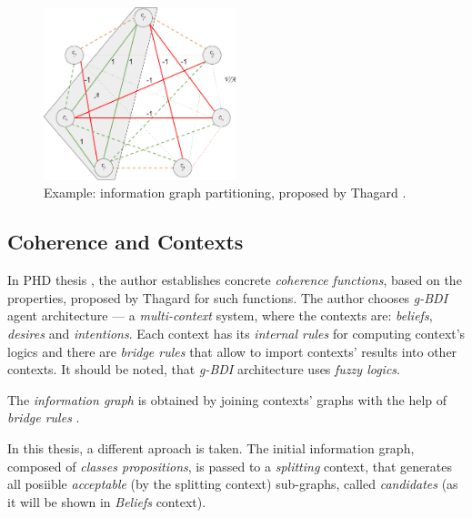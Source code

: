 \begin{figure}[h]
  \centering
  \includegraphics[width=0.5\textwidth]{img/UAB-splitting.png} %
  \caption{Example: information graph partitioning, proposed by Thagard
           \cite{ThagVerb98, UAB-Thesis}. }
  \label{fig:UAB-partition}
\end{figure}



\subsection{Coherence and Contexts}
\label{sec:coherence}

In PHD thesis \cite{UAB-Thesis}, the author establishes concrete
\emph{coherence functions}, based on the properties, proposed by Thagard for
such functions. The author chooses \emph{g-BDI} agent architecture ---
a \emph{multi-context} system, where the contexts are: \emph{beliefs},
\emph{desires} and \emph{intentions}. Each context has its \emph{internal rules}
for computing context's logics and there are \emph{bridge rules} that allow to
import contexts' results into other contexts. It should be noted, that \emph{g-BDI}
architecture uses \emph{fuzzy logics}.

The \emph{information graph} is obtained by joining contexts' graphs with the
help of \emph{bridge rules}  \cite[62]{UAB-Thesis}.

\bigskip

\medskip

\noindent
In this thesis, a different aproach is taken. The initial information graph,
composed of \emph{classes propositions}, is passed to a \emph{splitting} context,
that generates all posiible \emph{acceptable} (by the splitting context) sub-graphs,
called \emph{candidates} (as it will be shown in \emph{Beliefs} context).

